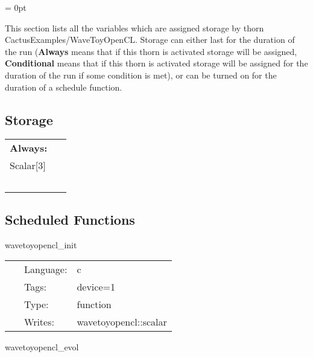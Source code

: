 \parskip = 0pt


\noindent This section lists all the variables which are assigned storage by thorn CactusExamples/WaveToyOpenCL.  Storage can either last for the duration of the run ({\bf Always} means that if this thorn is activated storage will be assigned, {\bf Conditional} means that if this thorn is activated storage will be assigned for the duration of the run if some condition is met), or can be turned on for the duration of a schedule function.


\subsection*{Storage}

\hspace{5mm}

 \begin{tabular*}{160mm}{ll} 

{\bf Always:}&  ~ \\ 
 Scalar[3] & ~\\ 
~ & ~\\ 
\end{tabular*} 


\subsection*{Scheduled Functions}
\vspace{5mm}


\hspace{5mm} wavetoyopencl\_init 

\hspace{5mm}{\it initialise scalar wave } 


\hspace{5mm}

 \begin{tabular*}{160mm}{cll} 
~ & Language:  & c \\ 
~ & Tags:  & device=1 \\ 
~ & Type:  & function \\ 
~ & Writes:  & wavetoyopencl::scalar \\ 
\end{tabular*} 


\vspace{5mm}


\hspace{5mm} wavetoyopencl\_evol 

